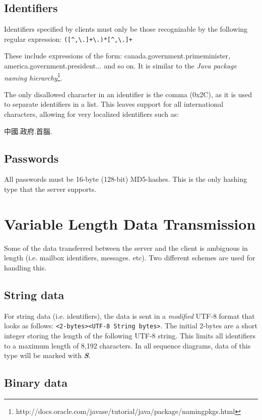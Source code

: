 \documentclass[10pt]{report}
\begin{document}
\subsection{Identifiers}

Identifiers specified by clients must only be those recognizable by the following regular expression: \verb|([^,\.]+\.)*[^,\.]+|

These include expressions of the form: canada.government.primeminister, america.government.president... and so on. It is similar to the \emph{Java package naming hierarchy}\footnote{http://docs.oracle.com/javase/tutorial/java/package/namingpkgs.html}.

The only disallowed character in an identifier is the comma (0x2C), as it is used to separate identifiers in a list. This leaves support for all international characters, allowing for very localized identifiers such as: \begin{CJK*}{UTF8}{min}
中國.政府.首腦.\end{CJK*}

\subsection{Passwords}

All passwords must be 16-byte (128-bit) MD5-hashes. This is the only hashing type that the server supports.

\section{Variable Length Data Transmission}

Some of the data transferred between the server and the client is ambiguous in length (i.e. mailbox identifiers, messages. etc). Two different schemes are used for handling this.

\subsection{String data}
\label{string_data}

For string data (i.e. identifiers), the data is sent in a \emph{modified} UTF-8 format that looks as follows: \verb|<2-bytes><UTF-8 String bytes>|. The initial 2-bytes are a short integer storing the length of the following UTF-8 string. This limits all identifiers to a maximum length of 8,192 characters. In all sequence diagrams, data of this type will be marked with \emph{\textbf{S}}.

\subsection{Binary data}
\label{bin_data}
\end{document}
